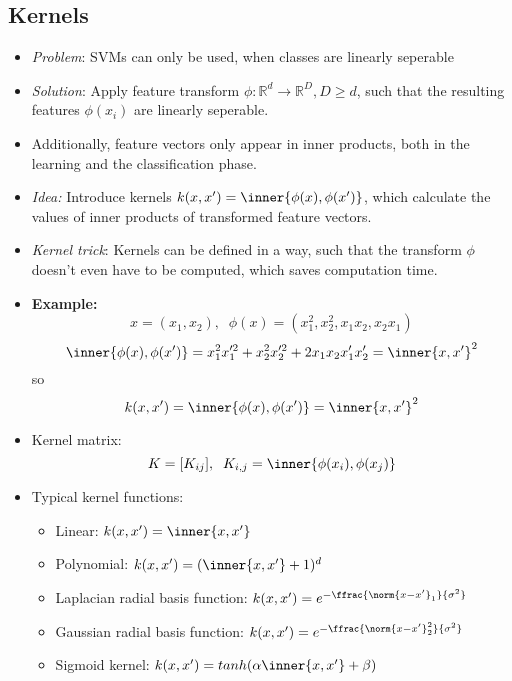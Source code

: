 \subsection*{Kernels}
\begin{itemize}
    \item
        \textit{Problem}: SVMs can only be used, when classes are linearly seperable
    \item
        \textit{Solution}: Apply feature transform $\phi: \mathbb{R}^{d} \rightarrow \mathbb{R}^{D}, D \geq d$, such that the resulting features $\phi(x_i)$ are linearly seperable.
    \item
        Additionally, feature vectors only appear in inner products, both in the learning and the classification phase.
    \item
        \textit{Idea:} Introduce kernels $k(x, x') = \inner{\phi(x), \phi(x')}$, which calculate the values of inner products of transformed feature vectors.
    \item
        \textit{Kernel trick}: Kernels can be defined in a way, such that the transform $\phi$ doesn't even have to be computed, which saves computation time.
    \item
        \textbf{Example:}
        $$x = (x_1, x_2),\;\; \phi(x) = (x_1^2, x_2^2, x_1 x_2, x_2 x_1)$$
        $$\inner{\phi(x), \phi(x')} = x_1^2 x_1 '^2 + x_2^2 x_2 '^2 + 2 x_1 x_2 x_1' x_2' = \inner{x, x'}^2$$
        so
        $$ k(x, x') = \inner{\phi(x), \phi(x')} = \inner{x,x'}^2$$
    \item
        Kernel matrix:
        $$ K = [K_{ij}], \; \; K_{i,j} = \inner{\phi(x_i), \phi(x_j)}$$
    \item
        Typical kernel functions:
        \begin{itemize}
            \item
                Linear: $k(x, x') = \inner{x, x'}$
            \item
                Polynomial: $k(x, x') = (\inner{x,x'} + 1)^d$
            \item
                Laplacian radial basis function: $k(x, x') = e^{-\ffrac{\norm{x-x'}_1}{\sigma^2}}$
            \item
                Gaussian radial basis function: $k(x, x') = e^{-\ffrac{\norm{x-x'}_2^2}{\sigma^2}}$
            \item
                Sigmoid kernel: $k(x, x') = tanh(\alpha \inner{x, x'} + \beta)$
        \end{itemize}
\end{itemize}
